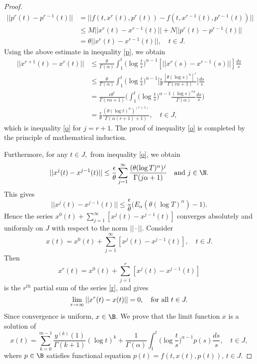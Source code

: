 \begin{proof}
\begin{align*}
||p^{r}(t)-p^{r-1}(t)||&=||f(t,x^{r}(t),p^{r}(t))-f(t,x^{r-1}(t),p^{r-1}(t))||\\
&\leq M ||x^{r}(t)-x^{r-1}(t)||+N||p^{r}(t)-p^{r-1}(t)||\\
&=\theta||x^{r}(t)-x^{r-1}(t)||,\quad t\in{J}.
\end{align*}
Using the above estimate in inequality \eqref{p}, we obtain
\begin{align*}
||x^{r+1}(t)-x^{r}(t)||&\leq\frac{\theta}{\Gamma(\alpha)}\int_{1}^{t}\bigg(\log{\frac{t}{s}}\bigg)^{\alpha-1}[||x^r(s)-x^{r-1}(s)||]\frac{ds}{s}\\
&\leq\frac{\theta}{\Gamma(\alpha)}\int_{1}^{t}\bigg(\log{\frac{t}{s}}\bigg)^{\alpha-1}\bigg[\frac{\epsilon}{\theta}\frac{[\theta(\log{s})^{\alpha}]^{r}}{\Gamma(r\alpha+1)}\bigg]\frac{ds}{s}\\
&=\frac{\epsilon\theta^r}{\Gamma(r\alpha+1)}\bigg(\int_{1}^{t}\bigg(\log{\frac{t}{s}}\bigg)^{\alpha-1}\frac{(\log{s})^{r\alpha}}{\Gamma(\alpha)}\frac{ds}{s}\bigg)\\
&=\frac{\epsilon}{\theta}\frac{(\theta(\log{t})^\alpha)^{(r+1)}}{\Gamma(\alpha(r+1)+1)},\quad t\in{J},
\end{align*}
which is inequality \eqref{o} for $j=r+1.$ The proof of inequality \eqref{o} is completed by the principle of mathematical induction.

Furthermore, for any $t\in{J},$ from inequality \eqref{o}, we obtain
\begin{equation*}
||x^{j}(t)-x^{j-1}(t)||\leq\frac{\epsilon}{\theta}\sum_{j=1}^{\infty}\frac{(\theta(\log{T})^{\alpha})^j}{\Gamma(j\alpha+1)} \quad\text{and}\,\,j\in\N.
\end{equation*}
This gives
\begin{equation}\label{q}
||x^{j}(t)-x^{j-1}(t)||\leq\frac{\epsilon}{\theta}\big(E_\alpha(\theta(\log{T})^{\alpha})-1\big).
\end{equation}
Hence the series $x^{0}(t)+\sum_{j=1}^{\infty}[x^j(t)-x^{j-1}(t)]$ converges absolutely and uniformly on ${J}$ with respect to the norm $||\cdot||.$ Consider
\begin{equation}\label{r}
x(t)=x^{0}(t)+\sum_{j=1}^{\infty}[x^j(t)-x^{j-1}(t)],\quad t\in{J}.
\end{equation}
Then
\begin{equation*}
x^r(t)=x^{0}(t)+\sum_{j=1}^{r}[x^j(t)-x^{j-1}(t)]
\end{equation*}
is the $r^{th}$ partial sum of the series \eqref{r}, and gives
\begin{equation}\label{s}
\lim_{r\to\infty}||x^r(t)-x(t)||=0,\quad \text{for\,\,all}\,\,t\in{J}.
\end{equation}
Since convergence is uniform, $x\in\B.$ We prove that the limit function $x$ is a solution of
\begin{equation*}
x(t)=\sum_{k=0}^{m-1}\frac{y^{(k)}(1)}{\Gamma(k+1)}(\log{t})^k+\frac{1}{\Gamma(\alpha)}\int_{1}^{t}\bigg(\log{\frac{t}{s}}\bigg)^{\alpha-1}p(s)\frac{ds}{s},\quad t\in{J},
\end{equation*}
where $p\in\B$ satisfies functional equation $p(t)=f(t,x(t),p(t)),\, t\in{J}.$


\end{proof}
